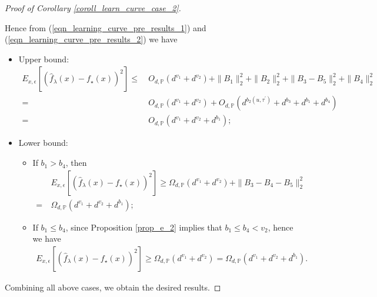\documentclass{article}
\theoremstyle{plain}
\theoremstyle{definition}
\theoremstyle{remark}
\begin{document}
\begin{appendix}
\begin{proof}[Proof of Corollary \ref{coroll_learn_curve_case_2}]
\begin{itemize}
    Hence from (\ref{eqn_learning_curve_pre_results_1}) and (\ref{eqn_learning_curve_pre_results_2}) we have
    \begin{itemize}
    \item Upper bound:
    \begin{align*}
E_{x, \epsilon} \left[ \left(\hat{f}_{\lambda}(x) - f_{\star}(x) \right)^{2} \right]
\leq &~ O_{d, \mathbb{P}} \left( d^{v_1} + d^{v_2}\right) + \|B_1\|_{2}^{2} + \|B_2\|_{2}^{2} + \|B_3 - B_5\|_{2}^{2} + \|B_4\|_{2}^{2}\\
= &~
O_{d, \mathbb{P}} \left( d^{v_1} + d^{v_2}\right) + O_{d, \mathbb{P}}\left( d^{b_2(u, \tau^{\prime})}  + d^{b_3} + d^{b_1} + d^{b_4} \right)\\
= &~ O_{d, \mathbb{P}} \left( d^{v_1} + d^{v_2} + d^{b_1}\right);
\end{align*}

\item Lower bound:
    \begin{itemize}
        \item If $b_1>b_4$, then
\begin{align*}
&~E_{x, \epsilon} \left[ \left(\hat{f}_{\lambda}(x) - f_{\star}(x) \right)^{2} \right]
\geq  \Omega_{d, \mathbb{P}} \left( d^{v_1} + d^{v_2} \right) + \|B_3-B_4-B_5\|_{2}^{2}\\
=&~
\Omega_{d, \mathbb{P}} \left( d^{v_1} + d^{v_2} + d^{b_1}\right);
\end{align*}

\item If $b_1 \leq b_4$, since Proposition \ref{prop_e_2} implies that $b_1 \leq b_4<v_2$, hence we have
\begin{align*}
E_{x, \epsilon} \left[ \left(\hat{f}_{\lambda}(x) - f_{\star}(x) \right)^{2} \right]
\geq
\Omega_{d, \mathbb{P}} \left( d^{v_1} + d^{v_2}\right)
=
\Omega_{d, \mathbb{P}} \left( d^{v_1} + d^{v_2} + d^{b_1}\right).
\end{align*}

    \end{itemize}

\end{itemize}
    
    
\end{itemize}
Combining all above cases, we obtain the desired results.
\end{proof}












\end{appendix}
\end{document}
